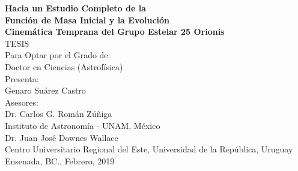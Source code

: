 \documentclass[12pt]{article}
\begin{document}
\vspace*{0mm}
\begin{center}
{\Large \textbf{Hacia un Estudio Completo de la}}\\ \vspace*{2mm}
{\Large \textbf{Funci\'on de Masa Inicial y la Evoluci\'on}}\\ \vspace*{2mm}
{\Large \textbf{Cinem\'atica Temprana del Grupo Estelar 25 Orionis}}\\
\vspace*{10mm}
{\huge TESIS}\\
\vspace*{5mm}
{\Large Para Optar por el Grado de:} \\
\vspace*{1mm}
{\Large Doctor en Ciencias (Astrof\'isica)}\\
\vspace*{10mm}
{\Large Presenta:}\\
\vspace*{5mm}
{\Large Genaro Su\'arez Castro}\\
\vspace*{10mm}
{\Large Asesores:}\\
\vspace*{3mm}
{\Large Dr. Carlos G. Rom\'an Z\'u\~niga} \\ {\large Instituto de Astronom\'ia - UNAM, M\'exico} \\
\vspace*{2mm}
{\Large Dr. Juan Jos\'e Downes Wallace} \\ {\large Centro Universitario Regional del Este, Universidad de la Rep\'ublica, Uruguay} \\
\vspace*{8mm}
{\Large Ensenada, BC., Febrero, 2019}

\end{center}
\end{document}
